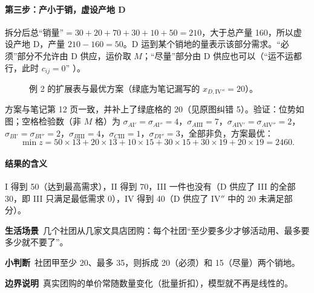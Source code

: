 \paragraph{第三步：产小于销，虚设产地 D}
拆分后总“销量”$=30+20+70+30+10+50=210$，大于总产量 160，所以虚设产地 D，产量 $210-160=50$。D 运到某个销地的量表示该部分需求。“必须”部分不允许由 D 供应，运价取 $M$；“尽量”部分由 D 供应也可以（“运不运都行，此时 $c_{ij}=0$” \orig）。
\begin{figure}[H]
\centering
{}
\caption{例 2 的扩展表与最优方案（绿底为笔记漏写的 $x_{D,\mathrm{IV}''}=20$）。}\label{fig:ex2}
\end{figure}
方案与笔记第 12 页一致，并补上了绿底格的 20（见原图纠错 5）。\supp 验证：位势如图；空格检验数（非 $M$ 格）为 $\sigma_{A\mathrm{I}'}=\sigma_{A\mathrm{I}''}=4$，$\sigma_{A\mathrm{III}}=7$，$\sigma_{A\mathrm{IV}'}=\sigma_{A\mathrm{IV}''}=2$，$\sigma_{B\mathrm{I}'}=\sigma_{B\mathrm{I}''}=2$，$\sigma_{B\mathrm{III}}=4$，$\sigma_{C\mathrm{III}}=1$，$\sigma_{D\mathrm{I}''}=3$，全部非负，方案最优：
\[
\min z=50\times13+20\times13+10\times15+30\times15+30\times19+20\times19=2460.
\]
\paragraph{结果的含义}
I 得到 50（达到最高需求），II 得到 70，III 一件也没有（D 供应了 III 的全部 30，即 III 只满足最低需求 0），IV 得到 40（D 供应了 IV$''$ 中的 20 未满足部分）。

\begin{lifebox}
\textbf{生活场景}\ 几个社团从几家文具店团购：每个社团“至少要多少才够活动用、最多要多少就不要了”。\par
{}
\textbf{小判断}\ 社团甲至少 20、最多 35，则拆成 20（必须）和 15（尽量）两个销地。\par
\textbf{边界说明}\ 真实团购的单价常随数量变化（批量折扣），模型就不再是线性的。
\end{lifebox}

